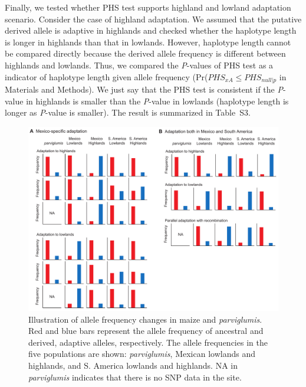 Finally, we tested whether PHS test supports highland and lowland adaptation scenario.
Consider the case of highland adaptation.
We assumed that the putative derived allele is adaptive in highlands and checked whether the haplotype length is longer in highlands than that in lowlands.
However, haplotype length cannot be compared directly because the derived allele frequency is different between highlands and lowlands.
Thus, we compared the \emph{P}-values of PHS test as a indicator of haplotype length given allele frequency (Pr($PHS_{xA}\leq PHS_{null|p}$ in Materials and Methods).
We just say that the PHS test is consistent if the \emph{P}-value in highlands is smaller than the \emph{P}-value in lowlands (haplotype length is longer as \emph{P}-value is smaller).
The result is summarized in Table~S3.

\renewcommand{\thefigure}{\Roman{figure}}
\setcounter{figure}{0}

\begin{figure}[b]
  \begin{center}
    \includegraphics[width=0.9\columnwidth]{fig/AllelePat.pdf}
    \caption{Illustration of allele frequency changes in maize and \emph{parviglumis}.  Red and blue bars represent the allele frequency of ancestral and derived, adaptive alleles, respectively.  The allele frequencies in the five populations are shown: \emph{parviglumis}, Mexican lowlands and highlands, and S. America lowlands and highlands. NA in \emph{parviglumis} indicates that there is no SNP data in the site.}
    \label{AllelePat}
  \end{center}
\end{figure}















